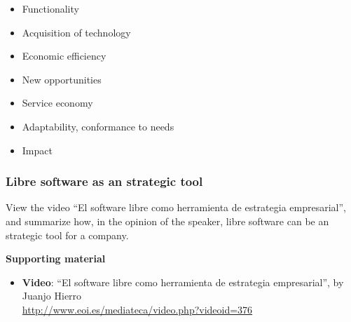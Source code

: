 \documentclass[a4paper]{article}
\begin{document}
\begin{itemize}
\item Functionality
\item Acquisition of technology
\item Economic efficiency
\item New opportunities
\item Service economy
\item Adaptability, conformance to needs
\item Impact
\end{itemize}


\subsubsection{Libre software as an strategic tool}
\label{sub:impact-strategic-tool}

View the video ``El software libre como herramienta de estrategia empresarial'', and summarize how, in the opinion of the speaker, libre software can be an strategic tool for a company.

\textbf{Supporting material}

\begin{itemize}
\item \textbf{Video}: ``El software libre como herramienta de estrategia empresarial'', by Juanjo Hierro \\
  \url{http://www.eoi.es/mediateca/video.php?videoid=376}
\end{itemize}
\end{document}
